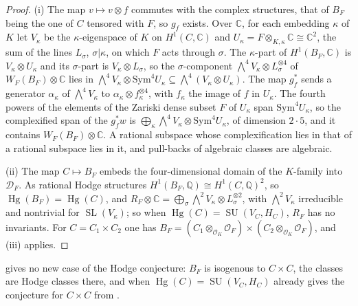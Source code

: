 \documentclass[11pt,reqno]{amsart}
\theoremstyle{plain}
\theoremstyle{definition}
\theoremstyle{remark}
\newcommand{\QQ}{\mathbb{Q}}
\newcommand{\CC}{\mathbb{C}}
\newcommand{\cO}{\mathcal{O}}
\newcommand{\cD}{\mathcal{D}}
\DeclareMathOperator{\Hg}{Hg}
\DeclareMathOperator{\SL}{SL}
\DeclareMathOperator{\SU}{SU}
\begin{document}
\begin{proof}
(i) The map $v\mapsto v\otimes f$ commutes with the complex structures, that of
$B_{F}$ being the one of $C$ tensored with $F$, so $g_{f}$ exists. Over $\CC$,
for each embedding $\kappa$ of $K$ let $V_{\kappa}$ be the $\kappa$-eigenspace
of $K$ on $H^{1}(C,\CC)$ and $U_{\kappa}=F\otimes_{K,\kappa}\CC\cong\CC^{2}$, the
sum of the lines $L_{\sigma}$, $\sigma|\kappa$, on which $F$ acts through
$\sigma$. The $\kappa$-part of $H^{1}(B_{F},\CC)$ is $V_{\kappa}\otimes
U_{\kappa}$ and its $\sigma$-part is $V_{\kappa}\otimes L_{\sigma}$, so the
$\sigma$-component $\bigwedge^{4}V_{\kappa}\otimes L_{\sigma}^{\otimes4}$ of
$W_{F}(B_{F})\otimes\CC$ lies in $\bigwedge^{4}V_{\kappa}\otimes
\mathrm{Sym}^{4}U_{\kappa}\subseteq\bigwedge^{4}(V_{\kappa}\otimes U_{\kappa})$.
The map $g_{f}^{*}$ sends a generator $\alpha_{\kappa}$ of $\bigwedge^{4}V_{\kappa}$
to $\alpha_{\kappa}\otimes f_{\kappa}^{\otimes4}$, with $f_{\kappa}$ the image
of $f$ in $U_{\kappa}$. The fourth powers of the elements of the Zariski
dense subset $F$ of $U_{\kappa}$ span $\mathrm{Sym}^{4}U_{\kappa}$, so the
complexified span of the $g_{f}^{*}w$ is $\bigoplus_{\kappa}\bigwedge^{4}V_{\kappa}
\otimes\mathrm{Sym}^{4}U_{\kappa}$, of dimension $2\cdot5$, and it contains
$W_{F}(B_{F})\otimes\CC$. A rational subspace whose complexification lies in
that of a rational subspace lies in it, and pull-backs of algebraic classes
are algebraic.

(ii) The map $C\mapsto B_{F}$ embeds the four-dimensional domain of the
$K$-family into $\cD_{F}$. As rational Hodge structures
$H^{1}(B_{F},\QQ)\cong H^{1}(C,\QQ)^{2}$, so $\Hg(B_{F})=\Hg(C)$, and
$R_{F}\otimes\CC=\bigoplus_{\sigma}\bigwedge^{2}V_{\kappa}\otimes
L_{\sigma}^{\otimes2}$, with $\bigwedge^{2}V_{\kappa}$ irreducible and
nontrivial for $\SL(V_{\kappa})$; so when $\Hg(C)=\SU(V_{C},H_{C})$, $R_{F}$
has no invariants. For $C=C_{1}\times C_{2}$ one has
$B_{F}=(C_{1}\otimes_{\cO_{K}}\cO_{F})\times(C_{2}\otimes_{\cO_{K}}\cO_{F})$, and
(iii) applies.
\end{proof}

 gives no new case of the Hodge conjecture: $B_{F}$ is
isogenous to $C\times C$, the classes are Hodge classes there, and when
$\Hg(C)=\SU(V_{C},H_{C})$ \cite[Proposition~2.24]{paperIII} already gives the conjecture for
$C\times C$ from \cite{Mar25a}.
\end{document}

